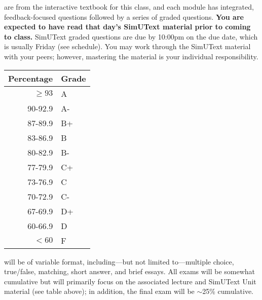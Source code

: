 \documentclass{tufte-handout}
\begin{document}
 are from the interactive textbook for this class, and each module has integrated, feedback-focused questions followed by a series of graded questions. \textbf{You are expected to have read that day's SimUText material prior to coming to class. } SimUText graded questions are due by 10:00pm on the due date, which is usually Friday (see schedule). You may work through the SimUText material with your peers; however, mastering the material is your individual responsibility.


\begin{margintable}
\begin{tabular}{rl}
Percentage & Grade \\
\hline 
$\ge93$ & A \\
90-92.9 & A- \\
87-89.9 & B+ \\
83-86.9 & B \\
80-82.9 & B- \\
77-79.9 & C+ \\
73-76.9 & C \\
70-72.9 & C- \\
67-69.9 & D+ \\
60-66.9 & D \\
$<60$ & F \\
\hline
\end{tabular}
\end{margintable}

 will be of variable format, including---but not limited to---multiple choice, true/false, matching, short answer, and brief essays. All exams will be somewhat cumulative but will primarily focus on the associated lecture and SimUText Unit material (see table above); in addition, the final exam will be $\sim$25\% cumulative. 
\end{document}
